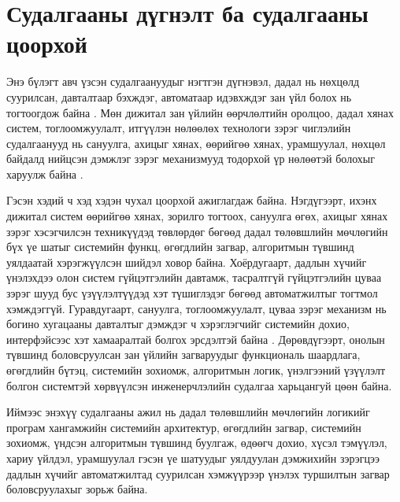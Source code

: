 \section{Судалгааны дүгнэлт ба судалгааны цоорхой}

Энэ бүлэгт авч үзсэн судалгаануудыг нэгтгэн дүгнэвэл, дадал нь нөхцөлд суурилсан, давталтаар бэхждэг, автоматаар идэвхждэг зан үйл болох нь тогтоогдож байна \cite{ref1,ref6}. Мөн дижитал зан үйлийн өөрчлөлтийн оролцоо, дадал хянах систем, тоглоомжуулалт, итгүүлэн нөлөөлөх технологи зэрэг чиглэлийн судалгаанууд нь сануулга, ахицыг хянах, өөрийгөө хянах, урамшуулал, нөхцөл байдалд нийцсэн дэмжлэг зэрэг механизмууд тодорхой үр нөлөөтэй болохыг харуулж байна \cite{ref5,ref13,ref15,ref16}.

Гэсэн хэдий ч хэд хэдэн чухал цоорхой ажиглагдаж байна. Нэгдүгээрт, ихэнх дижитал систем өөрийгөө хянах, зорилго тогтоох, сануулга өгөх, ахицыг хянах зэрэг хэсэгчилсэн техникүүдэд төвлөрдөг бөгөөд дадал төлөвшлийн мөчлөгийн бүх үе шатыг системийн функц, өгөгдлийн загвар, алгоритмын түвшинд уялдаатай хэрэгжүүлсэн шийдэл ховор байна. Хоёрдугаарт, дадлын хүчийг үнэлэхдээ олон систем гүйцэтгэлийн давтамж, тасралтгүй гүйцэтгэлийн цуваа зэрэг шууд бус үзүүлэлтүүдэд хэт түшиглэдэг бөгөөд автоматжилтыг тогтмол хэмждэггүй. Гуравдугаарт, сануулга, тоглоомжуулалт, цуваа зэрэг механизм нь богино хугацааны давталтыг дэмждэг ч хэрэглэгчийг системийн дохио, интерфэйсээс хэт хамааралтай болгох эрсдэлтэй байна \cite{ref5}. Дөрөвдүгээрт, онолын түвшинд боловсруулсан зан үйлийн загваруудыг функциональ шаардлага, өгөгдлийн бүтэц, системийн зохиомж, алгоритмын логик, үнэлгээний үзүүлэлт болгон системтэй хөрвүүлсэн инженерчлэлийн судалгаа харьцангуй цөөн байна.

Иймээс энэхүү судалгааны ажил нь дадал төлөвшлийн мөчлөгийн логикийг програм хангамжийн системийн архитектур, өгөгдлийн загвар, системийн зохиомж, үндсэн алгоритмын түвшинд буулгаж, өдөөгч дохио, хүсэл тэмүүлэл, хариу үйлдэл, урамшуулал гэсэн үе шатуудыг уялдуулан дэмжихийн зэрэгцээ дадлын хүчийг автоматжилтад суурилсан хэмжүүрээр үнэлэх туршилтын загвар боловсруулахыг зорьж байна.


